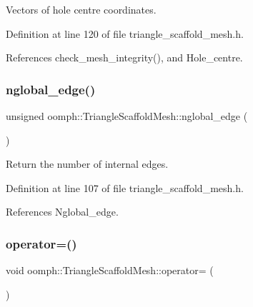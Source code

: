 Vectors of hole centre coordinates. 



Definition at line 120 of file triangle\+\_\+scaffold\+\_\+mesh.\+h.



References check\+\_\+mesh\+\_\+integrity(), and Hole\+\_\+centre.

\mbox{\label{classoomph_1_1TriangleScaffoldMesh_ac0f69f850608a7a7eacc5c1ce5156a3c}} 
\subsubsection{\texorpdfstring{nglobal\+\_\+edge()}{nglobal\_edge()}}
{\footnotesize\ttfamily unsigned oomph\+::\+Triangle\+Scaffold\+Mesh\+::nglobal\+\_\+edge (\begin{DoxyParamCaption}{ }\end{DoxyParamCaption})\hspace{0.3cm}{\ttfamily [inline]}}



Return the number of internal edges. 



Definition at line 107 of file triangle\+\_\+scaffold\+\_\+mesh.\+h.



References Nglobal\+\_\+edge.

\mbox{\label{classoomph_1_1TriangleScaffoldMesh_aedb8d1ce9b5e7d39687013ac3cf2afef}} 
\subsubsection{\texorpdfstring{operator=()}{operator=()}}
{\footnotesize\ttfamily void oomph\+::\+Triangle\+Scaffold\+Mesh\+::operator= (\begin{DoxyParamCaption}\item[{const \hyperlink{classoomph_1_1TriangleScaffoldMesh}{Triangle\+Scaffold\+Mesh} \&}]{ }\end{DoxyParamCaption})\hspace{0.3cm}{\ttfamily [inline]}}



